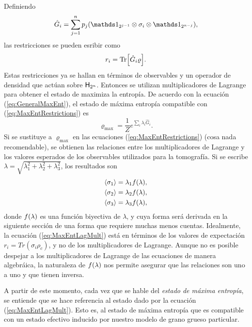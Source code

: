 Definiendo
\begin{equation}\label{eq:GhatNM}
    \hat{G}_{i}=\sum_{j=1}^{n}p_{j}(\Id_{2^{j-1}}\otimes\sigma_{i}\otimes\Id_{2^{n-j}}),
\end{equation}
las restricciones se pueden esribir como
\begin{equation}\label{eq:MaxEntRestrictions}
    r_{i}=\Tr[\hat{G}_{i}\varrho].
\end{equation}
Estas restricciones ya se hallan en términos de observables y un operador de densidad que actúan sobre ${\sf H}_{2^{n}}$. Entonces se utilizan multiplicadores de Lagrange para obtener el estado de maximiza la entropía. De acuerdo con la ecuación (\ref{eq:GeneralMaxEnt}), el estado de máxima entropía compatible con (\ref{eq:MaxEntRestrictions}) es
\begin{equation}\label{eq:MaxEntLagMult}
    \varrho_{\max}=\frac{1}{Z}e^{\sum_{i}\lambda_{i}\hat{G}_{i}}.
\end{equation}
Si se sustituye a $\varrho_{\max}$ en las ecuaciones (\ref{eq:MaxEntRestrictions}) (cosa nada recomendable), se obtienen las relaciones entre los multiplicadores de Lagrange y los valores esperados de los observables utilizados para la tomografía. Si se escribe $\lambda=\sqrt{\lambda_{1}^{2}+\lambda_{2}^{2}+\lambda_{3}^{2}}$, los resultados son
\begin{align}\label{eq:MaxEntExpVals}
    \begin{split}
    \expval{\sigma_{1}}&=\lambda_{1}f(\lambda),\\
    \expval{\sigma_{2}}&=\lambda_{2}f(\lambda),\\
    \expval{\sigma_{3}}&=\lambda_{3}f(\lambda),
    \end{split}
\end{align}
donde $f(\lambda)$ es una función biyectiva de $\lambda$, y cuya forma será derivada en la siguiente sección de una forma que requiere muchas menos cuentas. Idealmente, la ecuación (\ref{eq:MaxEntLagMult}) está en términos de los valores de expectación $r_{i}=Tr(\sigma_{i}\rho_{c})$, y no de los multiplicadores de Lagrange. Aunque no es posible despejar a los multiplicadores de Lagrange de las ecuaciones de manera algebráica, la naturaleza de $f(\lambda)$ nos permite asegurar que las relaciones son uno a uno y que tienen inversa.

A partir de este momento, cada vez que se hable del \textit{estado de máxima entropía}, se entiende que se hace referencia al estado dado por la ecuación (\ref{eq:MaxEntLagMult}). Esto es, al estado de máxima entropía que es compatible con un estado efectivo inducido por nuestro modelo de grano grueso particular.